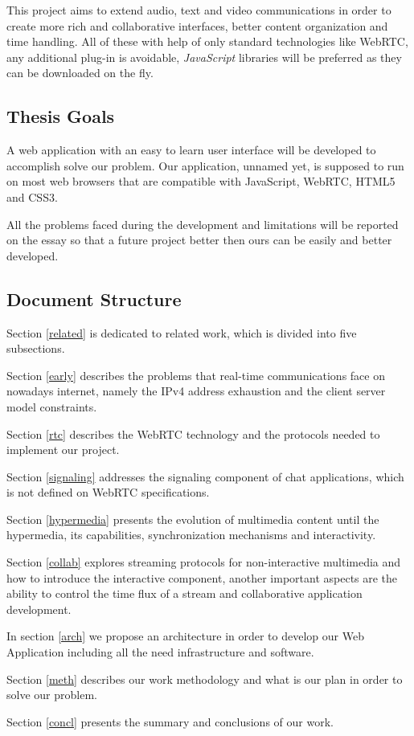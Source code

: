 	This project aims to extend audio, text and video communications in order to create more rich and collaborative interfaces, better content organization and time handling. All of these with help of only standard technologies like \ac{WebRTC}, any additional plug-in is avoidable, \emph{JavaScript} libraries will be preferred as they can be downloaded on the fly.  

\subsection{Thesis Goals} %

	A web application with an easy to learn user interface will be developed to accomplish solve our problem. Our application, unnamed yet, is supposed to run on most web browsers that are compatible with JavaScript, \ac{WebRTC}, \ac{HTML}5 and \ac{CSS}3.

	All the problems faced during the development and limitations will be reported on the essay so that a future project better then ours can be easily and better developed.

\subsection{Document Structure} %

	Section \ref{related} is dedicated to related work, which is divided into five subsections. 

	Section \ref{early} describes the problems that real-time communications face on nowadays internet, namely the \ac{IPv4} address exhaustion and the client server model constraints. 

	Section \ref{rtc} describes the \ac{WebRTC} technology and the protocols needed to implement our project. 

	Section \ref{signaling} addresses the signaling component of chat applications, which is not defined on \ac{WebRTC} specifications. 

	Section \ref{hypermedia} presents the evolution of multimedia content until the hypermedia, its capabilities, synchronization mechanisms and interactivity. 

	Section \ref{collab} explores streaming protocols for non-interactive multimedia and how to introduce the interactive component, another important aspects are the ability to control the time flux of a stream and collaborative application development.

	In section \ref{arch} we propose an architecture in order to develop our Web Application including all the need infrastructure and software.

	Section \ref{meth} describes our work methodology and what is our plan in order to solve our problem.

	Section \ref{concl} presents the summary and conclusions of our work.

